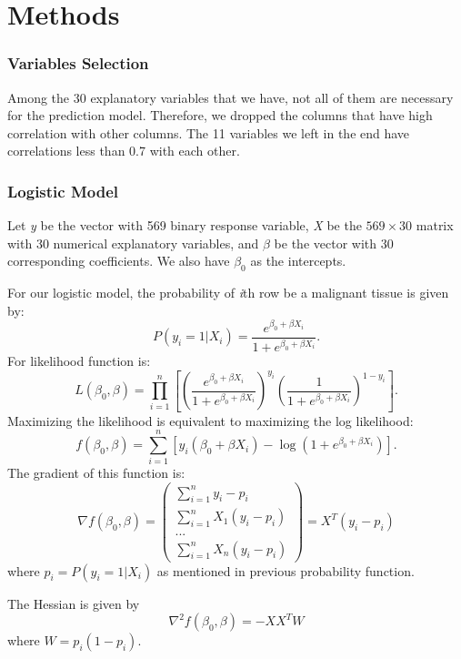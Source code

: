 \documentclass[
]{article}
\begin{document}
\hypertarget{methods}{%
\section{Methods}\label{methods}}

\hypertarget{variables-selection}{%
\subsubsection{Variables Selection}\label{variables-selection}}

Among the 30 explanatory variables that we have, not all of them are
necessary for the prediction model. Therefore, we dropped the columns
that have high correlation with other columns. The 11 variables we left
in the end have correlations less than 0.7 with each other.

\hypertarget{logistic-model}{%
\subsubsection{Logistic Model}\label{logistic-model}}

Let \textit{y} be the vector with 569 binary response variable,
\textit{X} be the \(569 \times 30\) matrix with 30 numerical explanatory
variables, and \textit{$\beta$} be the vector with 30 corresponding
coefficients. We also have \textit{$\beta_0$} as the intercepts.

For our logistic model, the probability of \textit{i}th row be a
malignant tissue is given by:
\[P(y_i=1|X_i) = \frac{e^{\beta_0+\beta X_i}}{1+e^{\beta_0+\beta X_i}}.\]
For likelihood function is:
\[L(\beta_0,\beta) = \prod_{i=1}^n [(\frac{e^{\beta_0+\beta X_i}}{1+e^{\beta_0+\beta X_i}})^{y_i}(\frac{1}{1+e^{\beta_0+\beta X_i}})^{1-y_i}].\]
Maximizing the likelihood is equivalent to maximizing the log
likelihood:
\[f(\beta_0,\beta) = \sum_{i=1}^n [y_i(\beta_0+\beta X_i)-\log(1+e^{\beta_0+\beta X_i})].\]
The gradient of this function is:
\[\nabla f(\beta_0,\beta)= \begin{pmatrix}
\sum_{i=1}^n y_i-p_i\\
\sum_{i=1}^n X_1(y_i-p_i)\\
...\\
\sum_{i=1}^n X_n(y_i-p_i)
\end{pmatrix} = X^T(y_i-p_i)\] where \(p_i = P(y_i=1|X_i)\) as mentioned
in previous probability function.

The Hessian is given by \[\nabla^2 f(\beta_0,\beta) = -XX^TW\] where
\(W = p_i(1-p_i)\).
\end{document}
